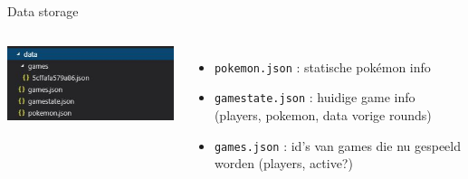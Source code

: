 \documentclass{beamer}
\begin{document}
\begin{frame}{Data storage}
	\begin{columns}
			\hspace{50pt}\includegraphics[scale=0.5]{Images/data.jpg} \\
			\bigskip
			\begin{itemize}
				\item \texttt{pokemon.json} : statische pokémon info
				\item \texttt{game\textunderscore state.json} : huidige game info (players, pokemon, data vorige rounds)
				\item \texttt{games.json} : id's van games die nu gespeeld worden (players, active?)
			\end{itemize}

\end{columns}
\end{frame}
\end{document}
